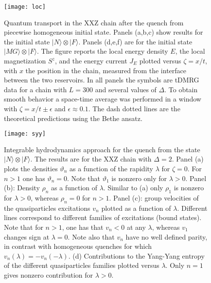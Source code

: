 \documentclass[twocolumn,superscriptaddress,prb,10pt]{revtex4-1}
\begin{document}


\begin{figure}[t]
\texttt{[image: loc]}
\caption{ Quantum transport in the XXZ chain after the quench from 
 piecewise homogeneous initial state. 
 Panels (a,b,c) show results for the initial state $|N\rangle\otimes|F\rangle$. Panels (d,e,f) are for the 
 initial state $|MG\rangle\otimes|F\rangle$. The figure reports the local energy density $E$, the local magnetization 
 $S^z$, and the energy current $J_E$ plotted versus $\zeta=x/t$, with $x$ the position in the chain, measured
 from the interface between the two reservoirs. In all panels the 
 symbols are tDMRG data for a chain with $L=300$ and several values of $\Delta$. 
 To obtain smooth behavior a space-time average was performed in a window with 
 $\zeta=x/t\pm\epsilon$ and $\epsilon\approx 0.1$. 
 The dash dotted lines are the theoretical predictions using the Bethe ansatz. 
}
\label{fig6}
\end{figure}

\begin{figure}[t]
\texttt{[image: syy]}
\caption{ Integrable hydrodynamics approach for the quench from 
 the state $|N\rangle\otimes|F\rangle$. The results are for 
 the XXZ chain with $\Delta=2$. Panel (a) plots the densities 
 $\vartheta_n$ as a function 
 of the rapidity $\lambda$ for $\zeta=0$. 
 For $n>1$ one has $\vartheta_n=0$. Note that $\vartheta_1$ 
 is nonzero only for $\lambda>0$. Panel (b): Density 
 $\rho_n$ as a function of $\lambda$. Similar to (a) only 
 $\rho_1$ is nonzero for $\lambda>0$, whereas $\rho_n=0$ for 
 $n>1$. Panel (c): group velocities of the quasiparticles 
 excitations $v_n$ plotted as a function of $\lambda$. Different 
 lines correspond to different families of excitations (bound states). 
 Note that for $n>1$, one has that $v_n<0$ at any $\lambda$, whereas 
 $v_1$ changes sign at $\lambda=0$. Note also that $v_n$ have no 
 well defined parity, in contrast with homogeneous quenches 
 for which $v_n(\lambda)=-v_n(-\lambda)$. (d) Contributions to the 
 Yang-Yang entropy of the different quasiparticles families plotted 
 versus $\lambda$. Only $n=1$ gives nonzero contribution 
 for $\lambda>0$.  
}
\label{fig7}
\end{figure}
\end{document}
